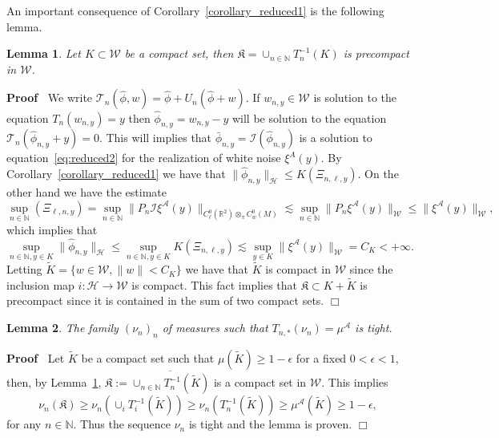 \documentclass[a4paper,10pt]{article}
\newcommand{\assign}{:=}
\newcommand{\asterisk}{\mathord{*}}
\newcommand{\nobracket}{}
\newenvironment{proof}{\noindent\textbf{Proof\ }}{\hspace*{\fill}$\Box$\medskip}
\newtheorem{lemma}{Lemma}
\begin{document}
An important consequence of Corollary~\ref{corollary_reduced1} is the
following lemma.

\begin{lemma}
  \label{lemma_reduced2}Let $K \subset \mathcal{W}$ be a compact set, then
  $\mathfrak{K} = \cup_{n \in \mathbb{N}} T^{- 1}_n (K)$ is precompact in
  $\mathcal{W}$.
\end{lemma}

\begin{proof}
  We write $\mathcal{T}_n (\hat{\phi}, w) = \hat{\phi} + U_n (\hat{\phi} + w)
  .$ If $w_{n, y} \in \mathcal{W}$ is solution to the equation $T_n  (w_{n,
  y}) = y$ then $\hat{\phi}_{n, y} = w_{n, y} - y$ will be solution to the
  equation $\mathcal{T}_n (\hat{\phi}_{n, y} + y) = 0$. This will implies that
  $\bar{\phi}_{n, y} = \mathcal{I} (\hat{\phi}_{n, y})$ is a solution to
  equation~{\eqref{eq:reduced2}} for the realization of white noise $\xi^A
  (y)$. By Corollary~\ref{corollary_reduced1} we have that $\| \hat{\phi}_{n,
  y} \|_{\mathcal{H}} \leqslant K (\Xi_{n, \ell, y})$. On the other hand we
  have the estimate
  \[ \sup_{n \in \mathbb{N}} (\Xi_{\ell, n, y}) = \sup_{n \in \mathbb{N}} \|
     P_n \mathcal{I} \xi^{\mathcal{A}} (y) \|_{\nobracket C^0_{\ell}
     (\mathbb{R}^2 \nobracket) \otimes_{\pi} C^0_w (M)} \lesssim \sup_{n \in
     \mathbb{N}} \| P_n \xi^{\mathcal{A}} (y) \|_{\mathcal{W}} \leqslant \|
     \xi^{\mathcal{A}} (y) \|_{\mathcal{W}}, \]
  which implies that
  \[ \sup_{n \in \mathbb{N}, y \in K} \| \hat{\phi}_{n, y} \|_{\mathcal{H}}
     \leqslant \sup_{n \in \mathbb{N}, y \in K} K (\Xi_{n, \ell, y}) \lesssim
     \sup_{y \in K} \| \xi^{\mathcal{A}} (y) \|_{\mathcal{W}} = C_K < + \infty
     . \]
  Letting $\tilde{K} = \{ w \in \mathcal{W}, \| w \| < C_K \}$ we have that
  $\tilde{K}$ is compact in $\mathcal{W}$ since the inclusion map $i :
  \mathcal{H} \rightarrow \mathcal{W}$ is compact. This fact implies that
  $\mathfrak{K} \subset K + \tilde{K}$ is precompact since it is contained in
  the sum of two compact sets.
\end{proof}

\begin{lemma}
  \label{lemma_reduced3}The family $(\nu_n)_n$ of measures such that $T_{n,
  \asterisk} (\nu_n) = \mu^{\mathcal{A}}$ is tight.
\end{lemma}

\begin{proof}
  Let $\tilde{K}$ be a compact set such that $\mu (\tilde{K}) \geqslant 1 -
  \epsilon$ for a fixed $0 < \epsilon < 1$, then, by
  Lemma~\ref{lemma_reduced2}, $\mathfrak{K} \assign \overline{\cup_{n \in
  \mathbb{N}} T^{- 1}_n (\tilde{K})}$ is a compact set in $\mathcal{W}$. This
  implies
  \[ \nu_n (\mathfrak{K}) \geqslant \nu_n (\cup_i T^{- 1}_i (\tilde{K}))
     \geqslant \nu_n (T^{- 1}_n (\tilde{K})) \geqslant \mu^{\mathcal{A}}
     (\tilde{K}) \geqslant 1 - \epsilon, \]
  for any $n \in \mathbb{N}$. Thus the sequence $\nu_n$ is tight and the lemma
  is proven. 
\end{proof}
\end{document}
